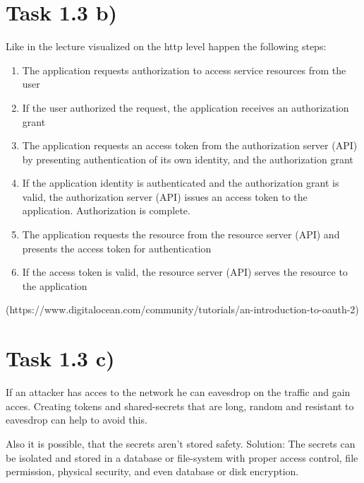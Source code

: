 \documentclass{article}
\begin{document}


\section*{Task 1.3 b)}
Like in the lecture visualized on the http level happen the following steps:
\begin{enumerate}
\item The application requests authorization to access service resources from
the user\\ 
\item If the user authorized the request, the application receives an
authorization grant\\
\item The application requests an access token from the
authorization server (API) by presenting authentication of its own identity, and the authorization grant
\item If the application identity is authenticated and the authorization grant
is valid, the authorization server (API) issues an access token to the
application. Authorization is complete.\\
\item The application requests the resource from the resource server (API) and
presents the access token for authentication\\
\item If the access token is valid, the resource server (API) serves the
resource to the application
\end{enumerate}
(https://www.digitalocean.com/community/tutorials/an-introduction-to-oauth-2)




\section*{Task 1.3 c)}
If an attacker has acces to the network he can eavesdrop on the traffic and gain
acces. Creating tokens and shared-secrets that are long, random and resistant
to eavesdrop can help to avoid this.

Also it is possible, that the secrets aren't stored safety. Solution: The
secrets can be isolated and stored in a database or file-system with proper
access control, file permission, physical security, and even database or disk
encryption.
\end{document}
